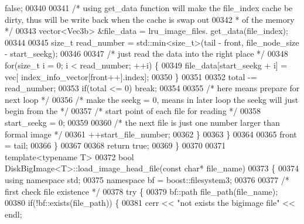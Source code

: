 \begin{DoxyCode}
{      false};
00340 
00341                                 \textcolor{comment}{/* using get\_data function will make the
       file\_index cache be dirty, thus will be write back when the cache is swap out }
00342 \textcolor{comment}{                                 * of the memory */}
00343                                 vector<Vec3b> &file\_data = lru\_image\_files.
      get\_data(file\_index);
00344 
00345                                 \textcolor{keywordtype}{size\_t} read\_number = std::min<size\_t>(tail - 
      front, file\_node\_size - start\_seekg);
00346 
00347                                 \textcolor{comment}{/* just read the data into the right place */}
00348                                 \textcolor{keywordflow}{for}(\textcolor{keywordtype}{size\_t} i = 0; i < read\_number; ++i) \{
00349                                         file\_data[start\_seekg + i] = vec[
      index\_info\_vector[front++].index];
00350                                 \}
00351 
00352                                 total -= read\_number;
00353                                 \textcolor{keywordflow}{if}(total <= 0)  \textcolor{keywordflow}{break};
00354 
00355                                 \textcolor{comment}{/* here means prepare for next loop */}
00356                                 \textcolor{comment}{/* make the seekg = 0, means in later loop the
       seekg will just begin from the */}
00357                                 \textcolor{comment}{/* start point of each file for reading */}
00358                                 start\_seekg = 0;
00359 
00360                                 \textcolor{comment}{/* the next file is just one number larger than
       formal image */}
00361                                 ++start\_file\_number;
00362                         \}
00363                 \}
00364 
00365                 front = tail;
00366         \}
00367 
00368         \textcolor{keywordflow}{return} \textcolor{keyword}{true};
00369 \}
00370 
00371 \textcolor{keyword}{template}<\textcolor{keyword}{typename} T>
00372 \textcolor{keywordtype}{bool} DiskBigImage<T>::load_image_head_file(\textcolor{keyword}{const} \textcolor{keywordtype}{char}* file\_name)
00373 \{
00374         \textcolor{keyword}{using namespace }std;
00375         \textcolor{keyword}{namespace }bf = boost::filesystem3;
00376 
00377         \textcolor{comment}{/* first check file existence */}
00378         \textcolor{keywordflow}{try} \{
00379                 bf::path file\_path(file\_name);
00380                 \textcolor{keywordflow}{if}(!bf::exists(file\_path)) \{
00381                         cerr << \textcolor{stringliteral}{"not exists the bigimage file"} << endl;

\end{DoxyCode}
